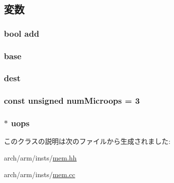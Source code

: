 \subsection{変数}
\hypertarget{classArmISA_1_1Memory_a077c453ada855fb73d907256d5e96465}{
\subsubsection[{add}]{\setlength{\rightskip}{0pt plus 5cm}bool {\bf add}}}
\label{classArmISA_1_1Memory_a077c453ada855fb73d907256d5e96465}
\hypertarget{classArmISA_1_1Memory_ad7a926fdfe0820284d654e9139a423b2}{
\subsubsection[{base}]{ {\bf base}}}
\label{classArmISA_1_1Memory_ad7a926fdfe0820284d654e9139a423b2}
\hypertarget{classArmISA_1_1Memory_aec72e8e45bdc87abeeeb75d2a8a9a716}{
\subsubsection[{dest}]{ {\bf dest}}}
\label{classArmISA_1_1Memory_aec72e8e45bdc87abeeeb75d2a8a9a716}
\hypertarget{classArmISA_1_1Memory_a0e01007cc580b30b13363bf037eb849f}{
\subsubsection[{numMicroops}]{\setlength{\rightskip}{0pt plus 5cm}const unsigned {\bf numMicroops} = 3}}
\label{classArmISA_1_1Memory_a0e01007cc580b30b13363bf037eb849f}
\hypertarget{classArmISA_1_1Memory_a4b95b3465f3133312f95fdaf25b90b36}{
\subsubsection[{uops}]{$\ast$ {\bf uops}}}
\label{classArmISA_1_1Memory_a4b95b3465f3133312f95fdaf25b90b36}


このクラスの説明は次のファイルから生成されました:\begin{DoxyCompactItemize}
\item 
arch/arm/insts/\hyperlink{arm_2insts_2mem_8hh}{mem.hh}\item 
arch/arm/insts/\hyperlink{arm_2insts_2mem_8cc}{mem.cc}\end{DoxyCompactItemize}
